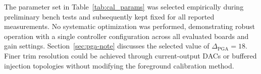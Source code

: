 The parameter set in Table~\ref{tab:cal_params} was selected empirically during preliminary bench tests and subsequently kept fixed for all reported measurements. No systematic optimization was performed, demonstrating robust operation with a single controller configuration across all evaluated boards and gain settings. Section~\ref{sec:pga-note} discusses the selected value of $\Delta_{\mathrm{PGA}}=18$. Finer trim resolution could be achieved through current-output DACs or buffered injection topologies \cite{InfineonAN60305} without modifying the foreground calibration method.


